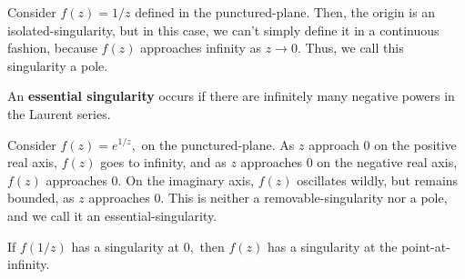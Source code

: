 \documentclass{article}
\begin{document}
\begin{example}
Consider $f(z) = 1/z$ defined in the \@{punctured-plane}. Then, the \@{origin} is an \@{isolated-singularity}, but in this case, we can't simply define it in a \@{continuous} fashion, because $f(z)$ approaches infinity as $z \to 0.$ Thus, we call this \@{singularity} a \@{pole}.
\end{example}

\begin{definition}
An \textbf{essential singularity} occurs if there are infinitely many negative powers in the Laurent series.
\end{definition}

\begin{example}
Consider $f(z) = e^{1/z},$ on the \@{punctured-plane}. As $z$ approach $0$ on the positive real axis, $f(z)$ goes to infinity, and as $z$ approaches $0$ on the negative real axis, $f(z)$ approaches 0. On the imaginary axis, $f(z)$ oscillates wildly, but remains \@{bounded}, as $z$ approaches $0.$ This is neither a \@{removable-singularity} nor a \@{pole}, and we call it an \@{essential-singularity}.
\end{example}

\begin{theorem}
If $f(1/z)$ has a \@{singularity} at $0,$ then $f(z)$ has a \@{singularity} at the \@{point-at-infinity}.
\end{theorem}
\end{document}

